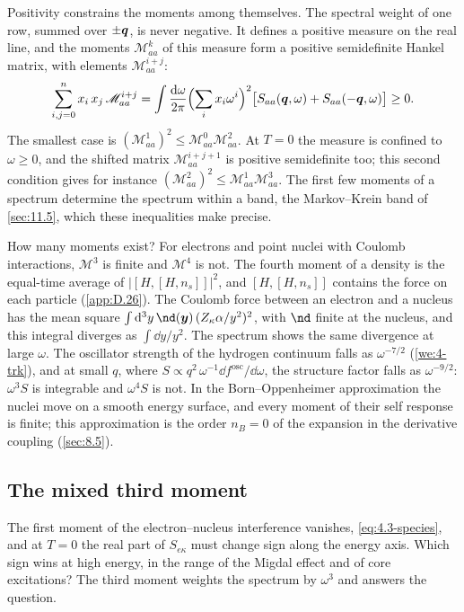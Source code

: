 Positivity constrains the moments among themselves. The spectral weight of one row, summed over $\pm\bm{q}$, is never negative. It defines a positive measure on the real line, and the moments $\mathscr{M}^k_{aa}$ of this measure form a positive semidefinite Hankel matrix, with elements $\mathscr{M}^{i+j}_{aa}$:
\begin{equation}
  \sum_{i,j=0}^{n}x_i\,x_j\,\mathscr{M}^{i+j}_{aa} = \int\frac{\mathrm{d}\omega}{2\pi}\Bigl(\sum_ix_i\omega^i\Bigr)^2\bigl[S_{aa}(\bm{q},\omega) + S_{aa}(-\bm{q},\omega)\bigr] \ge 0 .
  \label{eq:8.3-hankel}
\end{equation}
The smallest case is $(\mathscr{M}^1_{aa})^2 \le \mathscr{M}^0_{aa}\mathscr{M}^2_{aa}$. At $T = 0$ the measure is confined to $\omega \ge 0$, and the shifted matrix $\mathscr{M}^{i+j+1}_{aa}$ is positive semidefinite too; this second condition gives for instance $(\mathscr{M}^2_{aa})^2 \le \mathscr{M}^1_{aa}\mathscr{M}^3_{aa}$. The first few moments of a spectrum determine the spectrum within a band, the Markov--Krein band of \cref{sec:11.5}, which these inequalities make precise.

How many moments exist? For electrons and point nuclei with Coulomb interactions, $\mathscr{M}^3$ is finite and $\mathscr{M}^4$ is not. The fourth moment of a density is the equal-time average of $|[H,[H,n_s]]|^2$, and $[H,[H,n_s]]$ contains the force on each particle (\cref{app:D.26}). The Coulomb force between an electron and a nucleus has the mean square $\int\dd^3y\,\nd(\vect{y})\,(Z_\kappa\alpha/y^2)^2$, with $\nd$ finite at the nucleus, and this integral diverges as $\int\dd y/y^2$. The spectrum shows the same divergence at large $\omega$. The oscillator strength of the hydrogen continuum falls as $\omega^{-7/2}$ (\cref{we:4-trk}), and at small $q$, where $S \propto q^2\,\omega^{-1}\dd f^{\mathrm{osc}}/\dd\omega$, the structure factor falls as $\omega^{-9/2}$: $\omega^3S$ is integrable and $\omega^4S$ is not. In the Born--Oppenheimer approximation the nuclei move on a smooth energy surface, and every moment of their self response is finite; this approximation is the order $n_B = 0$ of the expansion in the derivative coupling (\cref{sec:8.5}).

\subsection{The mixed third moment}\label{sec:8.3-third}

The first moment of the electron--nucleus interference vanishes, \cref{eq:4.3-species}, and at $T = 0$ the real part of $S_{e\kappa}$ must change sign along the energy axis. Which sign wins at high energy, in the range of the Migdal effect and of core excitations? The third moment weights the spectrum by $\omega^3$ and answers the question.

